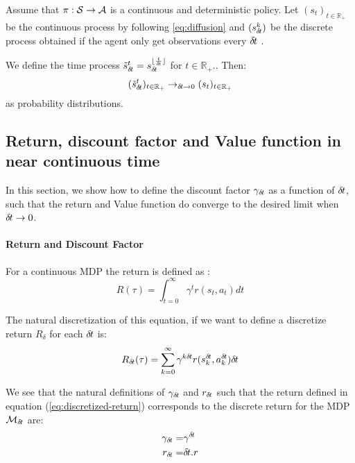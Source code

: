 \begin{theorem}
  Assume that $\pi: {\cal S} \rightarrow {\cal A}$ is a continuous and deterministic policy. Let $(s_t)_{t\in\mathbb{R}_+}$ be the continuous process by following \eqref{eq:diffusion} and $(s_{\delta\hspace{-.1em}t}^k)$ be the discrete process obtained if the agent only get observations every ${\delta\hspace{-.1em}t}$ .

  We define the time process $\tilde s_{\delta\hspace{-.1em}t}^t = s^{\lfloor \frac{t}{{\delta\hspace{-.1em}t}}\rfloor}_{\delta\hspace{-.1em}t}$ for $t\in\mathbb{R_+}$.. Then:
  \begin{equation}
    \label{eq:conv-traj}
    (\tilde s_{\delta\hspace{-.1em}t}^t)_{t\in\mathbb{R}_+} \rightarrow_{{\delta\hspace{-.1em}t} \rightarrow 0} (s_t)_{t\in\mathbb{R}_+}
  \end{equation}
  as probability distributions.
\end{theorem}




\subsection{Return, discount factor  and Value function in near continuous time}
\label{sec:ret-gamma-v}

In this section, we show how to define the discount factor $\gamma_{\delta\hspace{-.1em}t}$ as a function of ${\delta\hspace{-.1em}t}$, such that the return and Value function do converge to the desired limit when ${\delta\hspace{-.1em}t} \rightarrow 0$. 

\paragraph{Return and Discount Factor} For a continuous MDP the return is defined as :
\begin{equation}
  \label{eq:continuous-return}
  R(\tau) = \int_{t=0}^\infty\gamma^tr(s_t, a_t)dt
\end{equation}

The natural discretization of this equation, if we want to define a discretize return $R_\delta$ for each ${\delta\hspace{-.1em}t}$ is:
\begin{equation}
  \label{eq:discretized-return}
  R_{\delta\hspace{-.1em}t}(\tau) = \sum_{k=0}^\infty\gamma^{k{\delta\hspace{-.1em}t}}r(s^{\delta\hspace{-.1em}t}_k, a^{\delta\hspace{-.1em}t}_k){\delta\hspace{-.1em}t}
\end{equation}

We see that the natural definitions of $\gamma_{\delta\hspace{-.1em}t}$ and $r_{\delta\hspace{-.1em}t}$ such that the return defined in equation (\ref{eq:discretized-return}) corresponds to the discrete return for the MDP ${\cal M}_{\delta\hspace{-.1em}t}$ are:
\begin{align}
  \label{eq:def-gamma}
  \gamma_{\delta\hspace{-.1em}t} =& \gamma^{\delta\hspace{-.1em}t}\\
  \label{eq:def-reward}
  r_{\delta\hspace{-.1em}t} =& {\delta\hspace{-.1em}t} . r
\end{align}

